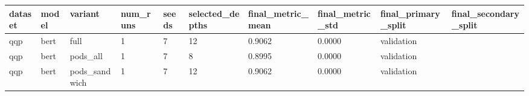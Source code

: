 \begin{tabular}{llllllllll}
\hline
dataset & model & variant & num\_runs & seeds & selected\_depths & final\_metric\_mean & final\_metric\_std & final\_primary\_split & final\_secondary\_split \\
\hline
qqp & bert & full & 1 & 7 & 12 & 0.9062 & 0.0000 & validation &  \\
qqp & bert & pods\_all & 1 & 7 & 8 & 0.8995 & 0.0000 & validation &  \\
qqp & bert & pods\_sandwich & 1 & 7 & 12 & 0.9062 & 0.0000 & validation &  \\
\hline
\end{tabular}

